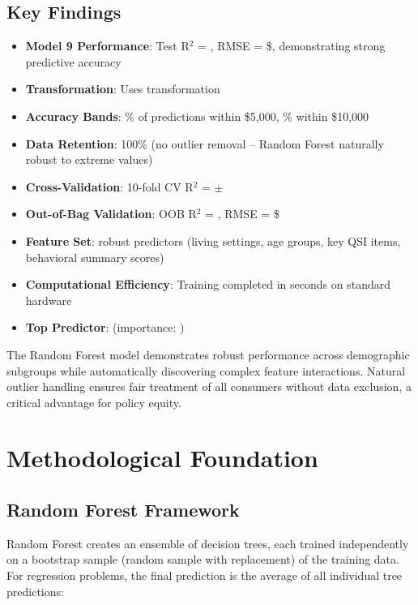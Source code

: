 \subsection{Key Findings}

\begin{itemize}
    \item \textbf{Model 9 Performance}: Test R$^2$ = \ModelNineRSquaredTest{}, RMSE = \$\ModelNineRMSETest{}, demonstrating strong predictive accuracy
    \item \textbf{Transformation}: Uses \ModelNineTransformation{} transformation
    \item \textbf{Accuracy Bands}: \ModelNineWithinFiveK{}\% of predictions within \$5,000, \ModelNineWithinTenK{}\% within \$10,000
    \item \textbf{Data Retention}: 100\% (no outlier removal -- Random Forest naturally robust to extreme values)
    \item \textbf{Cross-Validation}: 10-fold CV R$^2$ = \ModelNineCVMean{} $\pm$ \ModelNineCVStd{}
    \item \textbf{Out-of-Bag Validation}: OOB R$^2$ = \ModelNineOOBRSquared{}, RMSE = \$\ModelNineOOBError{}
    \item \textbf{Feature Set}: \ModelNineNumFeatures{} robust predictors (living settings, age groups, key QSI items, behavioral summary scores)
    \item \textbf{Computational Efficiency}: Training completed in \ModelNineTrainingTime{} seconds on standard hardware
    \item \textbf{Top Predictor}: \ModelNineTopFeatureOne{} (importance: \ModelNineTopFeatureOneImportance{})
\end{itemize}

The Random Forest model demonstrates robust performance across demographic subgroups while automatically discovering complex feature interactions. Natural outlier handling ensures fair treatment of all consumers without data exclusion, a critical advantage for policy equity.

\section{Methodological Foundation}

\subsection{Random Forest Framework}

Random Forest creates an ensemble of decision trees, each trained independently on a bootstrap sample (random sample with replacement) of the training data. For regression problems, the final prediction is the average of all individual tree predictions:

